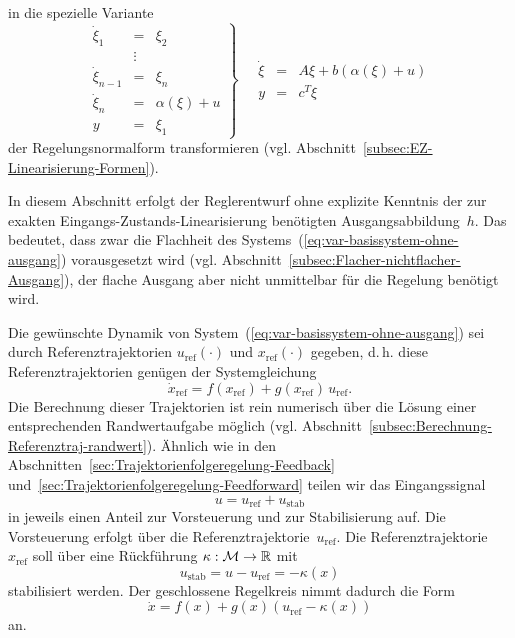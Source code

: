 in die spezielle Variante
\begin{equation}
\left.\begin{array}{lcl}
\dot{\xi}_{1} & = & \xi_{2}\\
 & \vdots\\
\dot{\xi}_{n-1} & = & \xi_{n}\\
\dot{\xi}_{n} & = & \alpha(\xi)+u\\
y & = & \xi_{1}
\end{array}\right\} \quad\begin{array}{rcl}
\dot{\xi} & = & A\xi+b(\alpha(\xi)+u)\\
y & = & c^{T}\xi
\end{array}\label{eq:var-Regelungs-NF-speziell}
\end{equation}
der Regelungsnormalform transformieren (vgl. Abschnitt~\ref{subsec:EZ-Linearisierung-Formen}). 

In diesem Abschnitt erfolgt der Reglerentwurf ohne explizite Kenntnis
der zur exakten Eingangs-Zustands-Linearisierung benötigten Ausgangsabbildung~$h$.
Das bedeutet, dass zwar die Flachheit des Systems~(\ref{eq:var-basissystem-ohne-ausgang})
vorausgesetzt wird (vgl. Abschnitt~\ref{subsec:Flacher-nichtflacher-Ausgang}),
der flache Ausgang aber nicht unmittelbar für die Regelung benötigt
wird.

Die gewünschte Dynamik von System~(\ref{eq:var-basissystem-ohne-ausgang})
sei durch Referenztrajektorien $u_{\text{ref}}(\cdot)$ und $x_{\text{ref}}(\cdot)$
gegeben, d.\,h. diese Referenztrajektorien genügen der Systemgleichung
\begin{equation}
\dot{x}_{\text{ref}}=f(x_{\text{ref}})+g(x_{\text{ref}})\,u_{\text{ref}}.\label{eq:var-al-referenz-system}
\end{equation}
Die Berechnung dieser Trajektorien ist rein numerisch über die Lösung
einer entsprechenden Randwertaufgabe möglich (vgl. Abschnitt~\ref{subsec:Berechnung-Referenztraj-randwert}).
Ähnlich wie in den Abschnitten~\ref{sec:Trajektorienfolgeregelung-Feedback}
und~\ref{sec:Trajektorienfolgeregelung-Feedforward} teilen wir das
Eingangssignal 
\[
u=u_{\text{ref}}+u_{\text{stab}}
\]
in jeweils einen Anteil zur Vorsteuerung und zur Stabilisierung auf.
Die Vorsteuerung erfolgt über die Referenztrajektorie~$u_{\text{ref}}$.
Die Referenztrajektorie~$x_{\text{ref}}$ soll über eine Rückführung
$\kappa:\mathcal{M}\to{\mathbb{R}}$ mit
\begin{equation}
u_{\text{stab}}=u-u_{\text{ref}}=-\kappa(x)\label{eq:var-al-stab}
\end{equation}
stabilisiert werden. Der geschlossene Regelkreis nimmt dadurch die
Form
\[
\dot{x}=f(x)+g(x)\left(u_{\text{ref}}-\kappa(x)\right)
\]
an.

